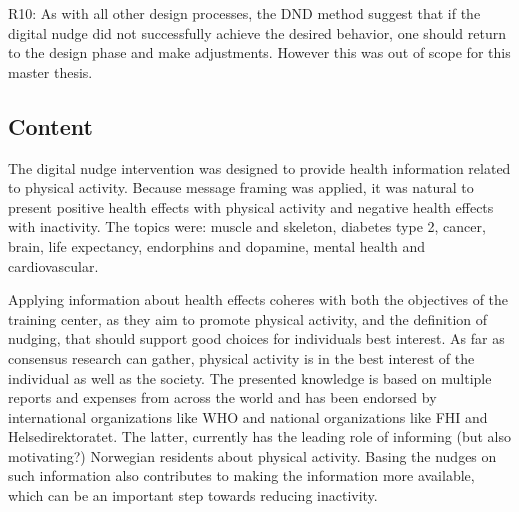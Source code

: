 R10: As with all other design processes, the DND method suggest that if the digital nudge did not successfully achieve the desired behavior, one should return to the design phase and make adjustments. However this was out of scope for this master thesis. 

\subsection{Content}
The digital nudge intervention was designed to provide health information related to physical activity. Because message framing was applied, it was natural to present positive health effects with physical activity and negative health effects with inactivity. The topics were: muscle and skeleton, diabetes type 2, cancer, brain, life expectancy, endorphins and dopamine, mental health and cardiovascular. 

Applying information about health effects coheres with both the objectives of the training center, as they aim to promote physical activity, and the definition of nudging, that should support good choices for individuals best interest. As far as consensus research can gather, physical activity is in the best interest of the individual as well as the society. 
The presented knowledge is based on multiple reports and expenses from across the world and has been endorsed by international organizations like WHO and national organizations like FHI and Helsedirektoratet. The latter, currently has the leading role of informing (but also motivating?) Norwegian residents about physical activity. Basing the nudges on such information also contributes to making the information more available, which can be an important step towards reducing inactivity.


